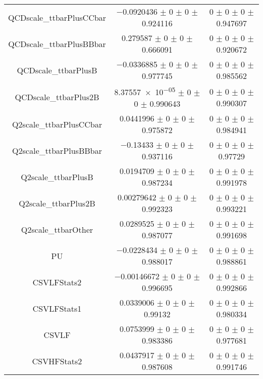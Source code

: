 \begin{table}
\begin{tabular}{ccc}
QCDscale\_ttbarPlusCCbar 	& \num{-0.0920436} $\pm$ \num{0} $\pm$ \num{0} $\pm$ \num{0.924116} 	& \num{0} $\pm$ \num{0} $\pm$ \num{0} $\pm$ \num{0.947697}\\
QCDscale\_ttbarPlusBBbar 	& \num{0.279587} $\pm$ \num{0} $\pm$ \num{0} $\pm$ \num{0.666091} 	& \num{0} $\pm$ \num{0} $\pm$ \num{0} $\pm$ \num{0.920672}\\
QCDscale\_ttbarPlusB 	& \num{-0.0336885} $\pm$ \num{0} $\pm$ \num{0} $\pm$ \num{0.977745} 	& \num{0} $\pm$ \num{0} $\pm$ \num{0} $\pm$ \num{0.985562}\\
QCDscale\_ttbarPlus2B 	& \num{8.37557e-05} $\pm$ \num{0} $\pm$ \num{0} $\pm$ \num{0.990643} 	& \num{0} $\pm$ \num{0} $\pm$ \num{0} $\pm$ \num{0.990307}\\
Q2scale\_ttbarPlusCCbar 	& \num{0.0441996} $\pm$ \num{0} $\pm$ \num{0} $\pm$ \num{0.975872} 	& \num{0} $\pm$ \num{0} $\pm$ \num{0} $\pm$ \num{0.984941}\\
Q2scale\_ttbarPlusBBbar 	& \num{-0.13433} $\pm$ \num{0} $\pm$ \num{0} $\pm$ \num{0.937116} 	& \num{0} $\pm$ \num{0} $\pm$ \num{0} $\pm$ \num{0.97729}\\
Q2scale\_ttbarPlusB 	& \num{0.0194709} $\pm$ \num{0} $\pm$ \num{0} $\pm$ \num{0.987234} 	& \num{0} $\pm$ \num{0} $\pm$ \num{0} $\pm$ \num{0.991978}\\
Q2scale\_ttbarPlus2B 	& \num{0.00279642} $\pm$ \num{0} $\pm$ \num{0} $\pm$ \num{0.992323} 	& \num{0} $\pm$ \num{0} $\pm$ \num{0} $\pm$ \num{0.993221}\\
Q2scale\_ttbarOther 	& \num{0.0289525} $\pm$ \num{0} $\pm$ \num{0} $\pm$ \num{0.987077} 	& \num{0} $\pm$ \num{0} $\pm$ \num{0} $\pm$ \num{0.991698}\\
PU 	& \num{-0.0228434} $\pm$ \num{0} $\pm$ \num{0} $\pm$ \num{0.988017} 	& \num{0} $\pm$ \num{0} $\pm$ \num{0} $\pm$ \num{0.988861}\\
CSVLFStats2 	& \num{-0.00146672} $\pm$ \num{0} $\pm$ \num{0} $\pm$ \num{0.996695} 	& \num{0} $\pm$ \num{0} $\pm$ \num{0} $\pm$ \num{0.992866}\\
CSVLFStats1 	& \num{0.0339006} $\pm$ \num{0} $\pm$ \num{0} $\pm$ \num{0.99132} 	& \num{0} $\pm$ \num{0} $\pm$ \num{0} $\pm$ \num{0.980334}\\
CSVLF 	& \num{0.0753999} $\pm$ \num{0} $\pm$ \num{0} $\pm$ \num{0.983386} 	& \num{0} $\pm$ \num{0} $\pm$ \num{0} $\pm$ \num{0.977681}\\
CSVHFStats2 	& \num{0.0437917} $\pm$ \num{0} $\pm$ \num{0} $\pm$ \num{0.987608} 	& \num{0} $\pm$ \num{0} $\pm$ \num{0} $\pm$ \num{0.991746}\\

\end{tabular}
\end{table}
